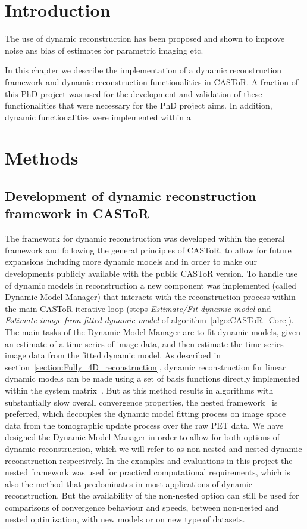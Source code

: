 \section{Introduction}
The use of dynamic reconstruction has been proposed and shown to improve noise ans bias of estimates for parametric imaging etc.

In this chapter we describe the implementation of a dynamic reconstruction framework and dynamic reconstruction functionalities in CASToR. A fraction of this PhD project was used for the development and validation of these functionalities that were necessary for the PhD project aims.
In addition, dynamic functionalities were implemented within a 

\section{Methods}

\subsection{Development of dynamic reconstruction framework in CASToR}
The framework for dynamic reconstruction was developed within the general framework and following the general principles of CASToR, to allow for future expansions including more dynamic models and in order to make our developments publicly available with the public CASToR version. 
To handle use of dynamic models in reconstruction a new component was implemented (called Dynamic-Model-Manager) that interacts with the reconstruction process within the main CASToR iterative loop (steps \textit{Estimate/Fit dynamic model} and \textit{Estimate image from fitted dynamic model} of algorithm~\ref{algo:CASToR_Core}). 
The main tasks of the Dynamic-Model-Manager are to fit dynamic models, given an estimate of a time series of image data, and then estimate the time series image data from the fitted dynamic model. 
As described in section~\ref{section:Fully_4D_reconstruction}, dynamic reconstruction for linear dynamic models can be made using a set of basis functions directly implemented within the system matrix~\cite{Matthews1995,Wang2008,Reader2014}. But as this method results in algorithms with substantially slow overall convergence properties, the nested framework~\cite{Wang2010,Matthews2010} is preferred, which decouples the dynamic model fitting process on image space data from the tomographic update process over the raw PET data.
We have designed the Dynamic-Model-Manager in order to allow for both options of dynamic reconstruction, which we will refer to as non-nested and nested dynamic reconstruction respectively. 
In the examples and evaluations in this project the nested framework was used for practical computational requirements, which is also the method that predominates in most applications of dynamic reconstruction. But the availability of the non-nested option can still be used for comparisons of convergence behaviour and speeds, between non-nested and nested optimization, with new models or on new type of datasets. 

